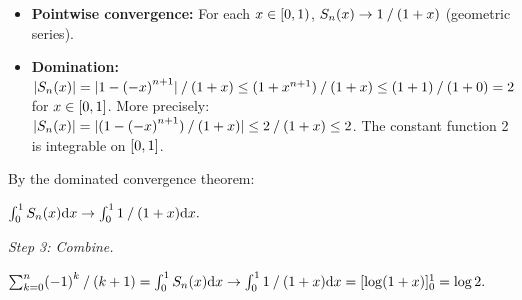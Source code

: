 \documentclass[
]{article}
\providecommand{\tightlist}{%
  \setlength{\itemsep}{0pt}\setlength{\parskip}{0pt}}
\begin{document}
\begin{itemize}
\tightlist
\item
  \textbf{Pointwise convergence:} For each
  \(x \in \mathopen{\mDelimiter{[}}{\mNumber{0}},{\mNumber{1}}\mathclose{\mDelimiter{)}}\),
  \(S_{n}\mathopen{\mDelimiter{(}}x\mathclose{\mDelimiter{)}} \to {\mNumber{1}}\mathbin{\mBridgeOperator{/}}\mathopen{\mDelimiter{(}}{\mNumber{1}}+x\mathclose{\mDelimiter{)}}\)
  (geometric series).
\item
  \textbf{Domination:}
  \(\mathopen{\mDelimiter{|}}S_{n}\mathopen{\mDelimiter{(}}x\mathclose{\mDelimiter{)}}\mathclose{\mDelimiter{|}} = \mathopen{\mDelimiter{|}}{\mNumber{1}}-\mathopen{\mDelimiter{(}}-x\mathclose{\mDelimiter{)}}^{n+{\mNumber{1}}}\mathclose{\mDelimiter{|}}\mathbin{\mBridgeOperator{/}}\mathopen{\mDelimiter{(}}{\mNumber{1}}+x\mathclose{\mDelimiter{)}} \le \mathopen{\mDelimiter{(}}{\mNumber{1}}+x^{n+{\mNumber{1}}}\mathclose{\mDelimiter{)}}\mathbin{\mBridgeOperator{/}}\mathopen{\mDelimiter{(}}{\mNumber{1}}+x\mathclose{\mDelimiter{)}} \le \mathopen{\mDelimiter{(}}{\mNumber{1}}+{\mNumber{1}}\mathclose{\mDelimiter{)}}\mathbin{\mBridgeOperator{/}}\mathopen{\mDelimiter{(}}{\mNumber{1}}+{\mNumber{0}}\mathclose{\mDelimiter{)}} = {\mNumber{2}}\)
  for
  \(x \in \mathopen{\mDelimiter{[}}{\mNumber{0}},{\mNumber{1}}\mathclose{\mDelimiter{]}}\).
  More precisely:
  \(\mathopen{\mDelimiter{|}}S_{n}\mathopen{\mDelimiter{(}}x\mathclose{\mDelimiter{)}}\mathclose{\mDelimiter{|}} = \mathopen{\mDelimiter{|}}\mathopen{\mDelimiter{(}}{\mNumber{1}}-\mathopen{\mDelimiter{(}}-x\mathclose{\mDelimiter{)}}^{n+{\mNumber{1}}}\mathclose{\mDelimiter{)}}\mathbin{\mBridgeOperator{/}}\mathopen{\mDelimiter{(}}{\mNumber{1}}+x\mathclose{\mDelimiter{)}}\mathclose{\mDelimiter{|}} \le {\mNumber{2}}\mathbin{\mBridgeOperator{/}}\mathopen{\mDelimiter{(}}{\mNumber{1}}+x\mathclose{\mDelimiter{)}} \le {\mNumber{2}}\).
  The constant function 2 is integrable on
  \(\mathopen{[}{0},{1}\mathclose{]}\).
\end{itemize}

By the dominated convergence theorem:

\(\int_{{\mNumber{0}}}^{{\mNumber{1}}} S_{n}\mathopen{\mDelimiter{(}}x\mathclose{\mDelimiter{)}} \mathrm{d}x \to \int_{{\mNumber{0}}}^{{\mNumber{1}}} {\mNumber{1}}\mathbin{\mBridgeOperator{/}}\mathopen{\mDelimiter{(}}{\mNumber{1}}+x\mathclose{\mDelimiter{)}} \mathrm{d}x.\)

\emph{Step 3: Combine.}

\(\sum_{k={\mNumber{0}}}^{n} \mathopen{\mDelimiter{(}}-{\mNumber{1}}\mathclose{\mDelimiter{)}}^{k}\mathbin{\mBridgeOperator{/}}\mathopen{\mDelimiter{(}}k+{\mNumber{1}}\mathclose{\mDelimiter{)}} = \int_{{\mNumber{0}}}^{{\mNumber{1}}} S_{n}\mathopen{\mDelimiter{(}}x\mathclose{\mDelimiter{)}} \mathrm{d}x \to \int_{{\mNumber{0}}}^{{\mNumber{1}}} {\mNumber{1}}\mathbin{\mBridgeOperator{/}}\mathopen{\mDelimiter{(}}{\mNumber{1}}+x\mathclose{\mDelimiter{)}} \mathrm{d}x = [\log\mathopen{\mDelimiter{(}}{\mNumber{1}}+x\mathclose{\mDelimiter{)}}]_{{\mNumber{0}}}^{{\mNumber{1}}} = \log {\mNumber{2}}.\)
\end{document}
